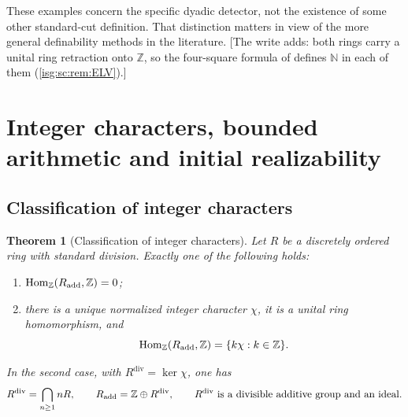 \documentclass[11pt]{article}
\newtheorem{theorem}{Theorem}[section]
\theoremstyle{definition}
\theoremstyle{remark}
\newcommand{\Z}{\mathbb{Z}}
\newcommand{\N}{\mathbb{N}}
\newcommand{\dv}{\mathrm{div}}
\newcommand{\Hom}{\operatorname{Hom}}
\begin{document}
These examples concern the specific dyadic detector, not the existence of
some other standard-cut definition. That distinction matters in view of
the more general definability methods in the literature. \textup{[}The
write adds: both rings carry a unital ring retraction onto $\Z$, so the
four-square formula of \cite[Theorem~2.9]{ELV} defines $\N$ in each of
them (\cref{isg:sc:rem:ELV}).\textup{]}

\section{Integer characters, bounded arithmetic and initial realizability}\label{isg:sc:sec:characters}

\subsection{Classification of integer characters}
\begin{theorem}[Classification of integer characters]\label{isg:sc:thm:characters}
Let $R$ be a discretely ordered ring with standard division. Exactly one
of the following holds:
\begin{enumerate}[label=\textup{(\roman*)},nosep]
\item $\Hom_{\Z}(R_{\rm add},\Z)=0$;
\item there is a unique normalized integer character $\chi$, it is a
unital ring homomorphism, and
\[
 \Hom_{\Z}(R_{\rm add},\Z)=\{k\chi:k\in\Z\}.
\]
\end{enumerate}
In the second case, with $R^{\dv}=\ker\chi$, one has
\begin{equation}\label{isg:sc:eq:kernel}
 R^{\dv}=\bigcap_{n\ge1}nR,\qquad R_{\rm add}=\Z\oplus R^{\dv},
 \qquad R^{\dv}\text{ is a divisible additive group and an ideal}.
\end{equation}
\end{theorem}
\end{document}

